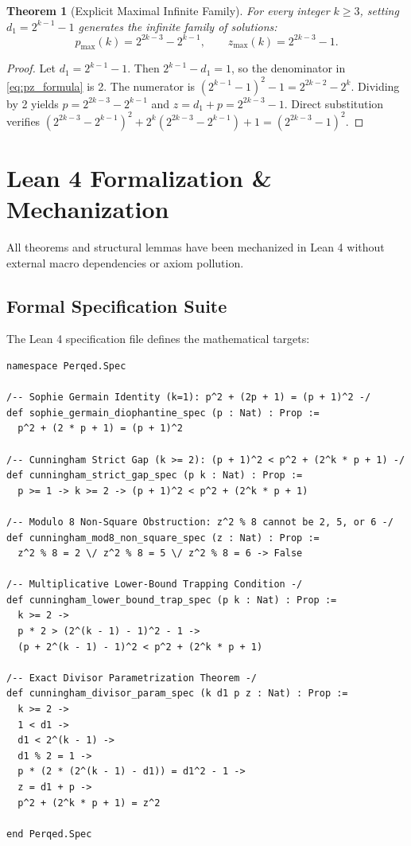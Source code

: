 \documentclass[11pt,a4paper]{article}
\newtheorem{theorem}{Theorem}
\begin{document}
\begin{theorem}[Explicit Maximal Infinite Family]
For every integer $k \ge 3$, setting $d_1 = 2^{k-1} - 1$ generates the infinite family of solutions:
\begin{equation}
p_{\max}(k) = 2^{2k-3} - 2^{k-1}, \qquad z_{\max}(k) = 2^{2k-3} - 1.
\end{equation}
\end{theorem}
\begin{proof}
Let $d_1 = 2^{k-1} - 1$. Then $2^{k-1} - d_1 = 1$, so the denominator in \eqref{eq:pz_formula} is 2. The numerator is $(2^{k-1}-1)^2 - 1 = 2^{2k-2} - 2^k$. Dividing by 2 yields $p = 2^{2k-3} - 2^{k-1}$ and $z = d_1 + p = 2^{2k-3} - 1$.
Direct substitution verifies $(2^{2k-3}-2^{k-1})^2 + 2^k(2^{2k-3}-2^{k-1}) + 1 = (2^{2k-3}-1)^2$.
\end{proof}

\section{Lean 4 Formalization & Mechanization}
All theorems and structural lemmas have been mechanized in Lean 4 without external macro dependencies or axiom pollution.

\subsection{Formal Specification Suite}
The Lean 4 specification file defines the mathematical targets:

\begin{lstlisting}[language=Lean]
namespace Perqed.Spec

/-- Sophie Germain Identity (k=1): p^2 + (2p + 1) = (p + 1)^2 -/
def sophie_germain_diophantine_spec (p : Nat) : Prop :=
  p^2 + (2 * p + 1) = (p + 1)^2

/-- Cunningham Strict Gap (k >= 2): (p + 1)^2 < p^2 + (2^k * p + 1) -/
def cunningham_strict_gap_spec (p k : Nat) : Prop :=
  p >= 1 -> k >= 2 -> (p + 1)^2 < p^2 + (2^k * p + 1)

/-- Modulo 8 Non-Square Obstruction: z^2 % 8 cannot be 2, 5, or 6 -/
def cunningham_mod8_non_square_spec (z : Nat) : Prop :=
  z^2 % 8 = 2 \/ z^2 % 8 = 5 \/ z^2 % 8 = 6 -> False

/-- Multiplicative Lower-Bound Trapping Condition -/
def cunningham_lower_bound_trap_spec (p k : Nat) : Prop :=
  k >= 2 ->
  p * 2 > (2^(k - 1) - 1)^2 - 1 ->
  (p + 2^(k - 1) - 1)^2 < p^2 + (2^k * p + 1)

/-- Exact Divisor Parametrization Theorem -/
def cunningham_divisor_param_spec (k d1 p z : Nat) : Prop :=
  k >= 2 ->
  1 < d1 ->
  d1 < 2^(k - 1) ->
  d1 % 2 = 1 ->
  p * (2 * (2^(k - 1) - d1)) = d1^2 - 1 ->
  z = d1 + p ->
  p^2 + (2^k * p + 1) = z^2

end Perqed.Spec
\end{lstlisting}
\end{document}
